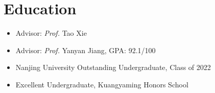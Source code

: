 \section{Education}

\begin{small}
\begin{itemize}
\item Advisor: \textit{Prof.} Tao Xie
\end{itemize}
\end{small}




\begin{small}
\begin{itemize}
\item Advisor: \textit{Prof.} Yanyan Jiang, GPA: 92.1/100
\item Nanjing University Outstanding Undergraduate, Class of 2022
\item Excellent Undergraduate, Kuangyaming Honors School
\end{itemize}
\end{small}
